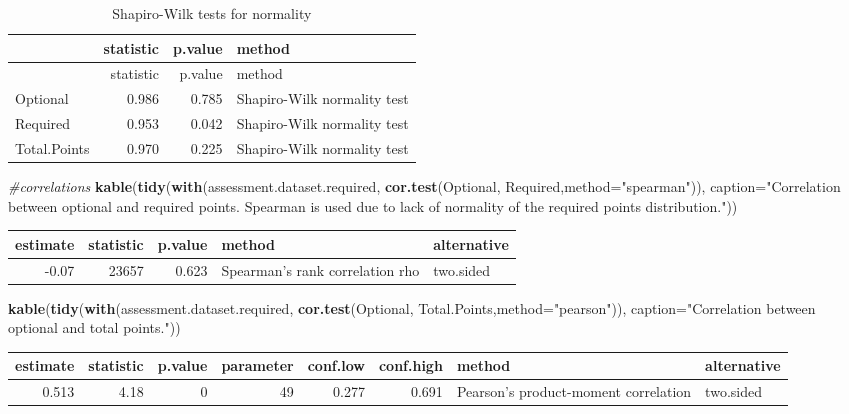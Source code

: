 \documentclass[]{article}
\newenvironment{Shaded}{\begin{snugshade}}{\end{snugshade}}
\newcommand{\KeywordTok}[1]{\textcolor[rgb]{0.13,0.29,0.53}{\textbf{#1}}}
\newcommand{\DataTypeTok}[1]{\textcolor[rgb]{0.13,0.29,0.53}{#1}}
\newcommand{\StringTok}[1]{\textcolor[rgb]{0.31,0.60,0.02}{#1}}
\newcommand{\CommentTok}[1]{\textcolor[rgb]{0.56,0.35,0.01}{\textit{#1}}}
\newcommand{\NormalTok}[1]{#1}
\begin{document}
\begin{longtable}[]{@{}lrrl@{}}
\caption{Shapiro-Wilk tests for normality}\tabularnewline
\toprule
& statistic & p.value & method\tabularnewline
\midrule
\endfirsthead
\toprule
& statistic & p.value & method\tabularnewline
\midrule
\endhead
Optional & 0.986 & 0.785 & Shapiro-Wilk normality test\tabularnewline
Required & 0.953 & 0.042 & Shapiro-Wilk normality test\tabularnewline
Total.Points & 0.970 & 0.225 & Shapiro-Wilk normality
test\tabularnewline
\bottomrule
\end{longtable}

\begin{Shaded}
\begin{Highlighting}[]
\CommentTok{#correlations}
\KeywordTok{kable}\NormalTok{(}\KeywordTok{tidy}\NormalTok{(}\KeywordTok{with}\NormalTok{(assessment.dataset.required, }\KeywordTok{cor.test}\NormalTok{(Optional, Required,}\DataTypeTok{method=}\StringTok{"spearman"}\NormalTok{)), }\DataTypeTok{caption=}\StringTok{"Correlation between optional and required points.  Spearman is used due to lack of normality of the required points distribution."}\NormalTok{))}
\end{Highlighting}
\end{Shaded}

\begin{longtable}[]{@{}rrrll@{}}
\toprule
estimate & statistic & p.value & method & alternative\tabularnewline
\midrule
\endhead
-0.07 & 23657 & 0.623 & Spearman's rank correlation rho &
two.sided\tabularnewline
\bottomrule
\end{longtable}

\begin{Shaded}
\begin{Highlighting}[]
\KeywordTok{kable}\NormalTok{(}\KeywordTok{tidy}\NormalTok{(}\KeywordTok{with}\NormalTok{(assessment.dataset.required, }\KeywordTok{cor.test}\NormalTok{(Optional, Total.Points,}\DataTypeTok{method=}\StringTok{"pearson"}\NormalTok{)), }\DataTypeTok{caption=}\StringTok{"Correlation between optional and total points."}\NormalTok{))}
\end{Highlighting}
\end{Shaded}

\begin{longtable}[]{@{}rrrrrrll@{}}
\toprule
estimate & statistic & p.value & parameter & conf.low & conf.high &
method & alternative\tabularnewline
\midrule
\endhead
0.513 & 4.18 & 0 & 49 & 0.277 & 0.691 & Pearson's product-moment
correlation & two.sided\tabularnewline
\bottomrule
\end{longtable}
\end{document}
